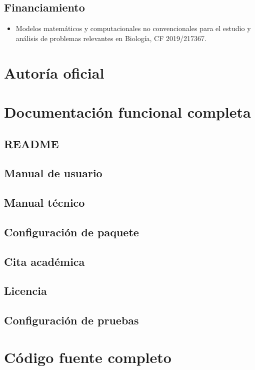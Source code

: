 \documentclass[11pt]{article}
\begin{document}
\subsection{Financiamiento}
\begin{itemize}
  \item Modelos matemáticos y computacionales no convencionales para el estudio y análisis de problemas relevantes en Biología, CF 2019/217367.
\end{itemize}

\section{Autoría oficial}

\section{Documentación funcional completa}
\subsection{README}
\subsection{Manual de usuario}
\subsection{Manual técnico}
\subsection{Configuración de paquete}
\subsection{Cita académica}
\subsection{Licencia}
\subsection{Configuración de pruebas}

\section{Código fuente completo}
\end{document}

